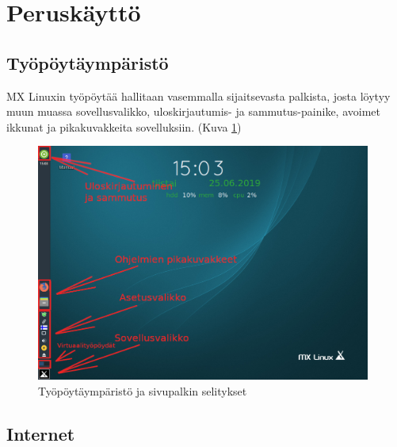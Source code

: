 \documentclass[a4paper, 12pt, finnish]{article}
\begin{document}
\section{Peruskäyttö}

\subsection{Työpöytäympäristö}
MX Linuxin työpöytää hallitaan vasemmalla sijaitsevasta palkista, josta löytyy muun muassa sovellusvalikko, uloskirjautumis- ja sammutus-painike, avoimet ikkunat ja pikakuvakkeita sovelluksiin.
(Kuva \ref{fig:tyopoytaymparisto})

\begin{figure}[htpb]
    \begin{center}
        \includegraphics[width=0.98\textwidth]{ymparisto/tyopoyta}
        \caption{Työpöytäympäristö ja sivupalkin selitykset}
        \label{fig:tyopoytaymparisto}
    \end{center}
\end{figure}
\clearpage

\subsection{Internet}
\end{document}
